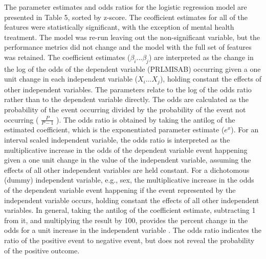 \documentclass[sigconf]{acmart}
\begin{document}
The parameter estimates and odds ratios for the logistic regression model 
are presented in Table 5, sorted by z-score. The ceofficient estimates for
all of the features were statistically significant, with the exception of 
mental health treatment. The model was re-run leaving out the non-significant 
variable, but the performance metrics did not change and the model with 
the full set of features was retained. The coefficient estimates 
($\beta_i$...$\beta_j$) are interpreted as the change in the log of the 
odds of the dependent variable (PRLMISAB) occurring given a one unit 
change in each independent variable ($X_i$...$X_j$), holding constant 
the effects of other independent variables. The parameters relate to the 
log of the odds ratio rather than to the dependent variable directly. 
The odds are calculated as the probability of the event occurring divided 
by the probability of the event not occurring ( \(\frac{P}{P-1}\) ). The 
odds ratio is obtained by taking the antilog of the estimated coefficient, 
which is the exponentiated parameter estimate ($e^x$). For an interval scaled 
independent variable, the odds ratio is interpreted as the multiplicative 
increase in the odds of the dependent variable event happening given a 
one unit change in the value of the independent variable, assuming the 
effects of all other independent variables are held constant. For a 
dichotomous (dummy) independent variable, e.g., sex, the multiplicative 
increase in the odds of the dependent variable event happening if the event
represented by the independent variable occurs, holding constant the effects 
of all other independent variables. In general, taking the antilog of the 
coefficient estimate, subtracting 1 from it, and multiplying the result 
by 100, provides the percent change in the odds for a unit increase in the 
independent variable  \cite{gujarati09}.  The odds ratio indicates the 
ratio of the positive event to negative event, but does not reveal the 
probability of the positive outcome.

\end{document}
